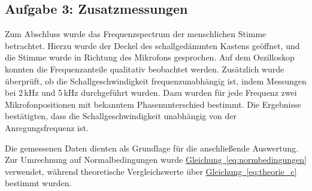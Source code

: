 \subsection*{Aufgabe 3: Zusatzmessungen}

Zum Abschluss wurde das Frequenzspectrum der menschlichen Stimme betrachtet. Hierzu wurde der Deckel des schallgedämmten Kastens geöffnet, und die Stimme wurde in Richtung des Mikrofons gesprochen. Auf dem Oszilloskop konnten die Frequenzanteile qualitativ beobachtet werden. Zusätzlich wurde überprüft, ob die Schallgeschwindigkeit frequenzunabhängig ist, indem Messungen bei 2\,kHz und 5\,kHz durchgeführt wurden. Dazu wurden für jede Frequenz zwei Mikrofonpositionen mit bekanntem Phasenunterschied bestimmt. Die Ergebnisse bestätigten, dass die Schallgeschwindigkeit unabhängig von der Anregungsfrequenz ist.

Die gemessenen Daten dienten als Grundlage für die anschließende Auswertung. Zur Umrechnung auf Normalbedingungen wurde \hyperref[eq:normbedingungen]{Gleichung~\ref*{eq:normbedingungen}} verwendet, während theoretische Vergleichswerte über \hyperref[eq:theorie_c]{Gleichung~\ref*{eq:theorie_c}} bestimmt wurden.
